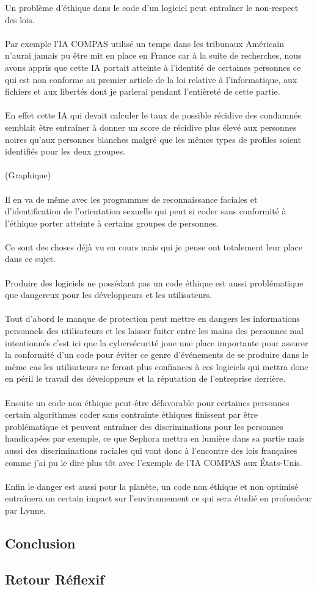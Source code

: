 \documentclass{article}
\begin{document}
Un problème d'éthique dans le code d'un logiciel peut entraîner le non-respect des lois.\\
\\Par exemple l'IA COMPAS utilisé un temps dans les tribunaux Américain n'aurai jamais pu être mit en place en France car à la suite de recherches, nous avons appris que cette IA portait atteinte à l'identité de certaines personnes ce qui est non conforme au premier article de la loi relative à l'informatique, aux fichiers et aux libertés dont je parlerai pendant l'entièreté de cette partie.\\
\\En effet cette IA qui devait calculer le taux de possible récidive des condamnés semblait être entraîner à donner un score de récidive plus élevé aux personnes noires qu’aux personnes blanches malgré que les mêmes types de profiles soient identifiés pour les deux groupes.\\
\\
(Graphique)
\\
\\Il en va de même avec les programmes de reconnaissance faciales et d'identification de l'orientation sexuelle qui peut si coder sans conformité à l'éthique porter atteinte à certains groupes de personnes.\\
\\Ce sont des choses déjà vu en cours mais qui je pense ont totalement leur place dans ce sujet.\\
\\Produire des logiciels ne possédant pas un code éthique est aussi problématique que dangereux pour les développeurs et les utilisateurs.\\
\\Tout d'abord le manque de protection peut mettre en dangers les informations personnels des utilisateurs et les laisser fuiter entre les mains des personnes mal intentionnés c'est ici que la cybersécurité joue une place importante pour assurer la conformité d'un code pour éviter ce genre d'événements de se produire dans le même cas les utilisateurs ne feront plus confiances à ces logiciels qui mettra donc en péril le travail des développeurs et la réputation de l'entreprise derrière.\\
\\Ensuite un code non éthique peut-être défavorable pour certaines personnes certain algorithmes coder sans contrainte éthiques finissent par être problématique et peuvent entraîner des discriminations pour les personnes handicapées par exemple, ce que Sephora mettra en lumière dans sa partie mais aussi des discriminations raciales qui vont donc à l'encontre des lois françaises comme j'ai pu le dire plus tôt avec l'exemple de l'IA COMPAS aux États-Unis.\\
\\Enfin le danger est aussi pour la planète, un code non éthique et non optimisé entraînera un certain impact sur l'environnement ce qui sera étudié en profondeur par Lynne.\\


\subsection{Conclusion}

\subsection{Retour Réflexif}




\end{document}
